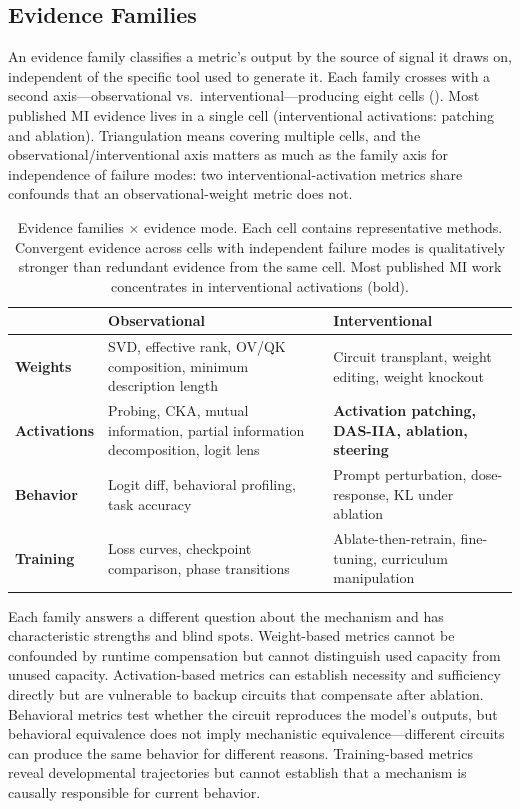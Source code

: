\documentclass{article}
\begin{document}
\subsection{Evidence Families}
\label{sec:evidence-families}

An evidence family classifies a metric's output by the source of signal it draws on, independent of the specific tool used to generate it. Each family crosses with a second axis---observational vs.\ interventional---producing eight cells (). Most published MI evidence lives in a single cell (interventional activations: patching and ablation). Triangulation means covering multiple cells, and the observational/interventional axis matters as much as the family axis for independence of failure modes: two interventional-activation metrics share confounds that an observational-weight metric does not.

\begin{table}[H]
\centering
\small
\caption{Evidence families $\times$ evidence mode. Each cell contains representative methods. Convergent evidence across cells with independent failure modes is qualitatively stronger than redundant evidence from the same cell. Most published MI work concentrates in interventional activations (bold).}
\label{tab:families}
\renewcommand{\arraystretch}{1.25}
\begin{tabular}{@{}l>{\raggedright\arraybackslash}p{5.8cm}>{\raggedright\arraybackslash}p{5.8cm}@{}}
\toprule
& \textbf{Observational} & \textbf{Interventional} \\
\midrule
\textbf{Weights} & SVD, effective rank, OV/QK composition, minimum description length & Circuit transplant, weight editing, weight knockout \\
\midrule
\textbf{Activations} & Probing, CKA, mutual information, partial information decomposition, logit lens & \textbf{Activation patching, DAS-IIA, ablation, steering} \\
\midrule
\textbf{Behavior} & Logit diff, behavioral profiling, task accuracy & Prompt perturbation, dose-response, KL under ablation \\
\midrule
\textbf{Training} & Loss curves, checkpoint comparison, phase transitions & Ablate-then-retrain, fine-tuning, curriculum manipulation \\
\bottomrule
\end{tabular}
\end{table}

Each family answers a different question about the mechanism and has characteristic strengths and blind spots. Weight-based metrics cannot be confounded by runtime compensation but cannot distinguish used capacity from unused capacity. Activation-based metrics can establish necessity and sufficiency directly but are vulnerable to backup circuits that compensate after ablation. Behavioral metrics test whether the circuit reproduces the model's outputs, but behavioral equivalence does not imply mechanistic equivalence---different circuits can produce the same behavior for different reasons. Training-based metrics reveal developmental trajectories but cannot establish that a mechanism is causally responsible for current behavior.
\end{document}
